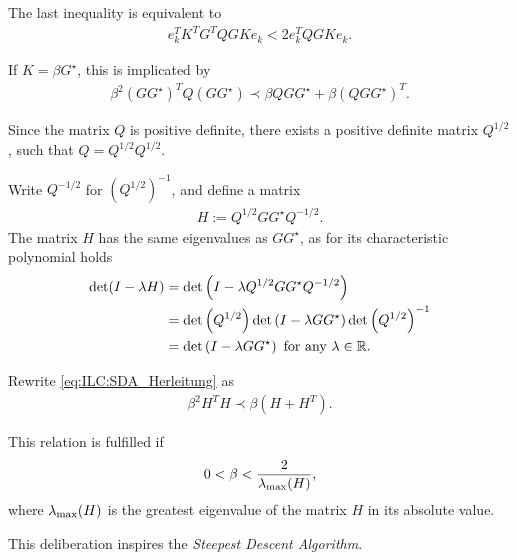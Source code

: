 The last inequality is equivalent to 
\begin{align}
e_k^T K^T G^T Q GK e_k < 2 e_k^T Q GK e_k.
\end{align}

If $K = \beta G^{\star}$, this is implicated by 
\begin{align}
\label{eq:ILC:SDA_Herleitung}
\beta^2 (G G^{\star})^T Q (G G^{\star}) \prec \beta Q G G^{\star} + \beta (Q G G^{\star})^T.
\end{align}

Since the matrix $Q$ is positive definite, there exists a positive definite matrix $Q^{1/2}$, such that $Q = Q^{1/2}Q^{1/2}$. 

Write $Q^{-1/2}$ for $\left(Q^{1/2}\right)^{-1}$, and define a matrix 
\begin{align}
H :=  Q^{1/2} G G^\star Q^{-1/2}. 
\end{align}
The matrix $H$ has the same eigenvalues as $G G^{\star}$, as for its characteristic polynomial holds 
\begin{align}
\label{eq:ILC:determinantGH}
\begin{split}
\det (I - \lambda H) &= \det \left(I - \lambda Q^{1/2} G G^\star Q^{-1/2}\right) \\
&= \det\left(Q^{1/2}\right)\det\left(I - \lambda G G^\star\right) \det\left(Q^{1/2}\right)^{-1} \\
&= \det\left(I - \lambda G G^\star\right) \text{ for any } \lambda \in {\mathbb{R}}. 
\end{split}
\end{align}

Rewrite \eqref{eq:ILC:SDA_Herleitung} as 
\begin{align}
\beta^2 H^T H \prec \beta (H + H^T). 
\end{align}

This relation is fulfilled if 
\begin{align}
0 < \beta < \frac{2}{\lambda_{\mathrm{max}}(H)}, 
\end{align}
where $\lambda_{\mathrm{max}}(H)$ is the greatest eigenvalue of the matrix $H$ in its absolute value. 


This deliberation inspires the \textit{Steepest Descent Algorithm}. 

